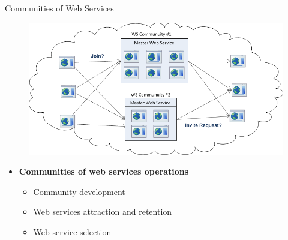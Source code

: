 \documentclass{beamer}
\begin{document}
\begin{frame}{Communities of Web Services}

    \begin{figure}[htbp]
        \centering
        \includegraphics[width=0.85 \columnwidth]{figures/community_tasks.png}
    \end{figure}

    \begin{itemize}
        \itemsep=.35cm
    	\item \textbf{Communities of web services operations}
        \begin{itemize}
          \item Community development
          \item Web services attraction and retention
          \item Web service selection
        \end{itemize}                      	      	
    \end{itemize}
\end{frame}
\end{document}
